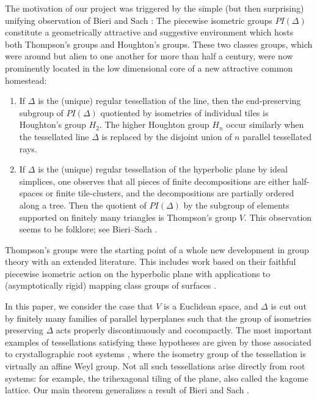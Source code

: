 \documentclass[11pt]{amsart}
\numberwithin{table}{section}
\numberwithin{figure}{section}
\theoremstyle{remark}
\begin{document}
The motivation of our project was triggered by the simple (but then
surprising) unifying observation of Bieri and Sach \cite{BS22}: The
piecewise isometric groups $PI(\Delta)$ constitute a geometrically
attractive and suggestive environment which hosts both Thompson's
groups and Houghton's groups. These two classes groups, which were
around but alien to one another for more than half a century, were now
prominently located in the low dimensional core of a new attractive
common homestead:
\begin{enumerate}
\item If $\Delta$ is the (unique) regular tessellation of the line,
  then the end-preserving subgroup of $PI(\Delta)$ quotiented by
  isometries of individual tiles is Houghton's group $H_2$. The higher
  Houghton group $H_n$ occur similarly when the tessellated line
  $\Delta$ is replaced by the disjoint union of $n$ parallel tessellated
  rays.
\item If $\Delta$ is the (unique) regular tessellation of the
  hyperbolic plane by ideal simplices, one observes that all pieces of
  finite decompositions are either half-spaces or finite
  tile-clusters, and the decompositions are partially ordered along a
  tree. Then the quotient of $PI(\Delta)$ by the subgroup of elements
  supported on finitely many triangles is Thompson's group $V$. This
  observation seems to be folklore; see Bieri--Sach
  \cite[\S2.6]{BS22}.
\end{enumerate}

Thompson's groups were the starting point of a whole new development
in group theory with an extended literature. This includes work based
on their faithful piecewise isometric action on the hyperbolic plane
with applications to (asymptotically rigid) mapping class groups of
surfaces \cite{Penner, FKS12, GLU22, ABKL24}.

In this paper, we consider the case that $V$ is a Euclidean space,
and $\Delta$ is cut out by finitely many families of parallel
hyperplanes such that the group of isometries preserving $\Delta$ acts
properly discontinuously and cocompactly. The most important examples
of tessellations satisfying these hypotheses are given by those
associated to crystallographic root systems \cite{Hum}, where the
isometry group of the tessellation is virtually an affine Weyl
group. Not all such tessellations arise directly from root systems:
for example, the trihexagonal tiling of the plane, also called the
kagome lattice. Our main theorem generalizes a result of Bieri and
Sach \cite{BS22}.
\end{document}
